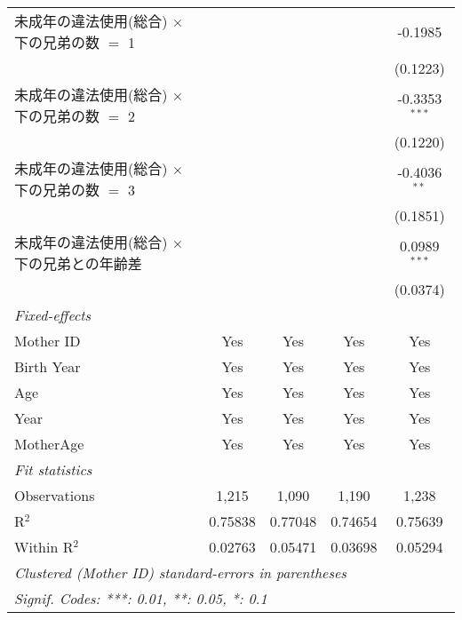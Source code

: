 \documentclass{article}
\begin{document}
\begin{landscape}
\begin{threeparttable}[b]
\begin{tabular}{lcccc}
      未成年の違法使用(総合) $\times$ 下の兄弟の数 $=$ 1  &               &                 &               & -0.1985\\   
                                                          &               &                 &               & (0.1223)\\   
      未成年の違法使用(総合) $\times$ 下の兄弟の数 $=$ 2  &               &                 &               & -0.3353$^{***}$\\   
                                                          &               &                 &               & (0.1220)\\   
      未成年の違法使用(総合) $\times$ 下の兄弟の数 $=$ 3  &               &                 &               & -0.4036$^{**}$\\   
                                                          &               &                 &               & (0.1851)\\   
      未成年の違法使用(総合) $\times$ 下の兄弟との年齢差  &               &                 &               & 0.0989$^{***}$\\   
                                                          &               &                 &               & (0.0374)\\   
      \midrule
      \emph{Fixed-effects}\\
      Mother ID                                           & Yes           & Yes             & Yes           & Yes\\  
      Birth Year                                          & Yes           & Yes             & Yes           & Yes\\  
      Age                                                 & Yes           & Yes             & Yes           & Yes\\  
      Year                                                & Yes           & Yes             & Yes           & Yes\\  
      MotherAge                                           & Yes           & Yes             & Yes           & Yes\\  
      \midrule
      \emph{Fit statistics}\\
      Observations                                        & 1,215         & 1,090           & 1,190         & 1,238\\  
      R$^2$                                               & 0.75838       & 0.77048         & 0.74654       & 0.75639\\  
      Within R$^2$                                        & 0.02763       & 0.05471         & 0.03698       & 0.05294\\  
      \midrule \midrule
      \multicolumn{5}{l}{\emph{Clustered (Mother ID) standard-errors in parentheses}}\\
      \multicolumn{5}{l}{\emph{Signif. Codes: ***: 0.01, **: 0.05, *: 0.1}}\\
   \end{tabular}
   

\end{threeparttable}
\end{landscape}
\end{document}
